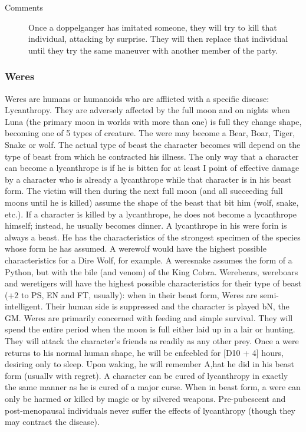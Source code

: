 \begin{multicols}{2}
\begin{description}
\item[Comments] Once a doppelganger has imitated someone, they will try to
kill that individual, attacking by surprise. They will then replace
that individual until they try the same maneuver with another member
of the party.

\end{description}

\subsubsection{Weres}

\begin{description}
\setlength\itemsep{0pt}

\item[Comments] Weres are humans or humanoids who are afflicted with a
specific disease: Lycanthropy. They are adversely affected by the full
moon and on nights when Luna (the primary moon in worlds with more
than one) is full they change shape, becoming one of 5 types of
creature. The were may become a Bear, Boar, Tiger, Snake or wolf. The
actual type of beast the character becomes will depend on the type of
beast from which he contracted his illness. The only way that a
character can become a lycanthrope is if he is bitten for at least I
point of effective damage by a character who is already a lycanthrope
while that character is in his beast form. The victim will then during
the next full moon (and all succeeding full moons until he is killed)
assume the shape of the beast that bit him (wolf, snake, etc.). If a
character is killed by a lycanthrope, he does not become a lycanthrope
himself; instead, he usually becomes dinner.  A lycanthrope in his
were forin is always a beast. He has the characteristics of the
strongest specimen of the species whose form he has assumed. A
werewolf would have the highest possible characteristics for a Dire
Wolf, for example. A weresnake assumes the form of a Python, but with
the bile (and venom) of the King Cobra. Werebears, wereboars and
weretigers will have the highest possible characteristics for their
type of beast (+2 to PS, EN and FT, usually): when in their beast
form, Weres are semi-intelligent. Their human side is suppressed and
the character is played bN, the GM. Weres are primarily concerned
with feeding and simple survival. They will spend the entire period
when the moon is full either laid up in a lair or hunting. They will
attack the character's friends as readily as any other prey.  Once a
were returns to his normal human shape, he will be enfeebled for [D10 +
4] hours, desiring only to sleep. Upon waking, he will remember A,hat
he did in his beast form (usuallv with regret).  A character can be
cured of lycanthropy in exactly the same manner as he is cured of a
major curse.  When in beast form, a were can only be harmed or killed
by magic or by silvered weapons.  Pre-pubescent and post-menopausal
individuals never suffer the effects of lycanthropy (though they may
contract the disease).

\end{description}
\end{multicols}
